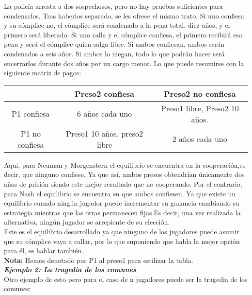 \documentclass[10pt,a4paper]{book}
\begin{document}
La policía arresta a dos sospechosos, pero no hay pruebas suficientes para
condenarlos. Tras haberlos separado, se les ofrece el mismo trato. Si uno confiesa y su cómplice no, el cómplice será condenado a la pena total, diez años, y el primero será liberado. Si uno calla y el cómplice confiesa, el primero recibirá esa pena y será el cómplice quien salga libre. Si ambos confiesan, ambos serán condenados a seis años. Si ambos lo niegan, todo lo que podrán hacer será encerrarlos durante dos años por un cargo menor. Lo que puede resumirse con la siguiente matriz de pagos:

\begin{center}
	\begin{tabular}{|c|c|c|}
		\hline
		 & Preso2 confiesa & Preso2 no confiesa \\
		\hline
		P1 confiesa & 6 años cada uno & Preso1 libre, Preso2 10 años. \\
		\hline
		P1 no confiesa & Preso1 10 años, preso2 libre & 2 años cada uno \\
		\hline
	\end{tabular}
\end{center}

Aquí, para Neuman y Morgenstern el equilibrio se encuentra en la cooperación,es decir, que ninguno confiese. Ya que así, ambos presos obtendrían únicamente dos años de prisión siendo este mejor resultado que no cooperando. Por el contrario, para Nash el equilibrio se encuentra en que ambos confiesen. Ya que existe un equilibrio cuando ningún jugador puede incrementar su ganancia cambiando su estrategia mientras que las otras permanecen fijas.Es decir, una vez realizada la alternativa, ningún jugador se arrepiente de su elección.\\
Este es el equilibrio desarrollado ya que ninguno de los jugadores puede asumir que su cómplice vaya a callar, por lo que suponiendo que habla la mejor opción para él, es hablar también. \\

\textbf{Nota:} Hemos denotado por P1 al preso1 para estilizar la tabla.\\

\textit{\textbf{Ejemplo 2: La tragedia de los comunes}} \\

Otro ejemplo de esto pero para el caso de n jugadores puede ser la tragedia de los comunes: \\
\end{document}
